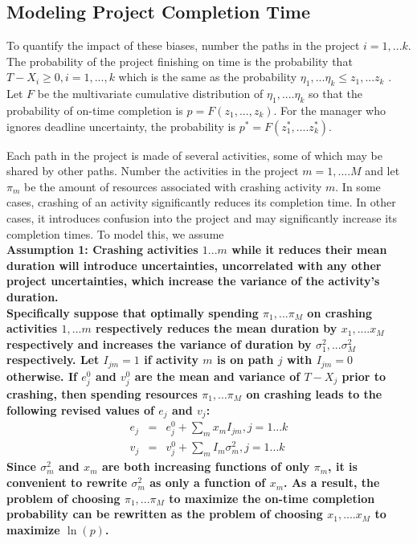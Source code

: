 \documentclass[11pt]{article}
\begin{document}
\subsection{Modeling Project Completion Time}
 To quantify the impact of these biases, number the paths in the project $i=1,...k$. 
 The probability of the project finishing on time is the probability that $T-X_i \geq 0, i=1,...,k$ which is the same as the probability
 $\eta_1,...\eta_k \leq z_1,...z_k$ . Let
 $F$ be the multivariate cumulative distribution of $\eta_1,....\eta_k$ so that the probability of on-time completion is
 $p=F(z_1,...,z_k)$. For the manager who ignores deadline uncertainty, the probability is
$p^*=F(z^*_1,....z^*_k)$. \par
Each path in the project is made of several activities, some of which may be shared by other paths.
Number the activities in the project $m=1,....M$ and let $\pi_m$ be the amount of resources associated with crashing activity $m$.   In some cases, crashing of an activity significantly reduces its completion time.  In other cases, it introduces confusion into the project and may significantly increase its completion times.  To model this, we assume \\
\bf Assumption 1: \rm Crashing activities $1...m$ while it reduces their mean duration will introduce uncertainties, uncorrelated with any other project uncertainties, which increase the variance of the activity's duration.  \\
Specifically suppose that optimally spending $\pi_1,...\pi_M$ on crashing activities $1,...m$ respectively reduces the mean duration by $x_1,....x_M$ respectively and increases the variance of duration by $\sigma^2_1,...\sigma^2_M$ respectively.
Let $I_{jm}=1$ if activity $m$ is on path $j$ with $I_{jm}=0$ otherwise. If $e^0_j$ and $v^0_j$ are the mean and variance of $T-X_j$ prior to crashing, then spending resources $\pi_1,...\pi_M$ on crashing leads to the following revised values of $e_j$ and $v_j$:
\begin{eqnarray*}
e_j &=& e^0_j+\sum_m x_m I_{jm}, j=1...k \\
v_j &=& v^0_j+\sum_m I_m \sigma^2_m, j=1...k
\end{eqnarray*}
Since $\sigma^2_m$ and $x_m$ are both increasing functions of only $\pi_m$, it is convenient to rewrite $\sigma^2_m$ as only a function of $x_m$.   As a result, the problem of choosing $\pi_1,...\pi_M$ to maximize the on-time completion probability can be rewritten as the problem of choosing $x_1,....x_M$ to maximize $\ln(p)$.\par 
\end{document}
